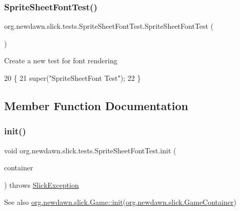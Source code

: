\subsubsection{\texorpdfstring{Sprite\+Sheet\+Font\+Test()}{SpriteSheetFontTest()}}
{\footnotesize\ttfamily org.\+newdawn.\+slick.\+tests.\+Sprite\+Sheet\+Font\+Test.\+Sprite\+Sheet\+Font\+Test (\begin{DoxyParamCaption}{ }\end{DoxyParamCaption})\hspace{0.3cm}{\ttfamily [inline]}}

Create a new test for font rendering 
\begin{DoxyCode}
20                                 \{
21       super(\textcolor{stringliteral}{"SpriteSheetFont Test"});
22    \}
\end{DoxyCode}


\subsection{Member Function Documentation}
\mbox{\label{classorg_1_1newdawn_1_1slick_1_1tests_1_1_sprite_sheet_font_test_ac0db7d20128ed1f4d1a2363e37a44494}} 
\subsubsection{\texorpdfstring{init()}{init()}}
{\footnotesize\ttfamily void org.\+newdawn.\+slick.\+tests.\+Sprite\+Sheet\+Font\+Test.\+init (\begin{DoxyParamCaption}\item[{\mbox{\hyperlink{classorg_1_1newdawn_1_1slick_1_1_game_container}{Game\+Container}}}]{container }\end{DoxyParamCaption}) throws \mbox{\hyperlink{classorg_1_1newdawn_1_1slick_1_1_slick_exception}{Slick\+Exception}}\hspace{0.3cm}{\ttfamily [inline]}}

\begin{DoxySeeAlso}{See also}
\mbox{\hyperlink{interfaceorg_1_1newdawn_1_1slick_1_1_game_ad2dd6affab08bb8fdb5fab0815957b7a}{org.\+newdawn.\+slick.\+Game\+::init}}(\mbox{\hyperlink{classorg_1_1newdawn_1_1slick_1_1_game_container}{org.\+newdawn.\+slick.\+Game\+Container}}) 
\end{DoxySeeAlso}


